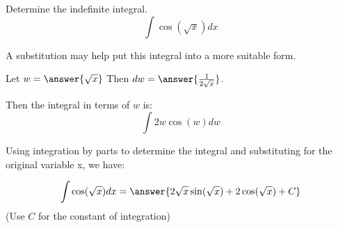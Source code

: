\documentclass{ximera}
\author{Jason Miller}
\begin{document}
\begin{exercise}
Determine the indefinite integral. 
\[
\int \cos(\sqrt{x}) dx
\]


A substitution may help put this integral into a more suitable form. 

Let $w=\answer{\sqrt{x}}$ Then $dw=\answer{\frac{1}{2\sqrt{x}}}$. 

Then the integral in terms of $w$ is:
\[
\int {2w\cos(w)} dw
\]

Using integration by parts to determine the integral and substituting for the original variable x, we have:

\[
\int \cos(\sqrt{x}) dx =\answer{ 2\sqrt{x}\sin(\sqrt{x})+2\cos(\sqrt{x}) +C}
\]
(Use $C$ for the constant of integration)

\end{exercise}
\end{document}
